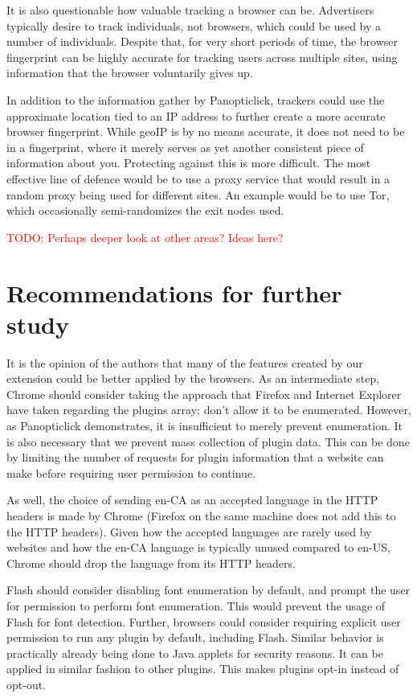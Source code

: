 \documentclass[12pt,a4paper]{article}
\begin{document}
It is also questionable how valuable tracking a browser can be. Advertisers typically desire to track individuals, not browsers, which could be used by a number of individuals. Despite that, for very short periods of time, the browser fingerprint can be highly accurate for tracking users across multiple sites, using information that the browser voluntarily gives up.

In addition to the information gather by Panopticlick, trackers could use the approximate location tied to an IP address to further create a more accurate browser fingerprint. While geoIP is by no means accurate, it does not need to be in a fingerprint, where it merely serves as yet another consistent piece of information about you. Protecting against this is more difficult. The most effective line of defence would be to use a proxy service that would result in a random proxy being used for different sites. An example would be to use Tor\cite{tor}, which occasionally semi-randomizes the exit nodes used.

\textcolor{red}{TODO: Perhaps deeper look at other areas? Ideas here?}

\section{Recommendations for further study}
It is the opinion of the authors that many of the features created by our extension could be better applied by the browsers. As an intermediate step, Chrome should consider taking the approach that Firefox and Internet Explorer have taken regarding the plugins array: don't allow it to be enumerated. However, as Panopticlick demonstrates, it is insufficient to merely prevent enumeration. It is also necessary that we prevent mass collection of plugin data. This can be done by limiting the number of requests for plugin information that a website can make before requiring user permission to continue.

As well, the choice of sending en-CA as an accepted language in the HTTP headers is made by Chrome (Firefox on the same machine does not add this to the HTTP headers). Given how the accepted languages are rarely used by websites and how the en-CA language is typically unused compared to en-US, Chrome should drop the language from its HTTP headers.

Flash should consider disabling font enumeration by default, and prompt the user for permission to perform font enumeration. This would prevent the usage of Flash for font detection. Further, browsers could consider requiring explicit user permission to run any plugin by default, including Flash. Similar behavior is practically already being done to Java applets for security reasons. It can be applied in similar fashion to other plugins. This makes plugins opt-in instead of opt-out.
\end{document}

